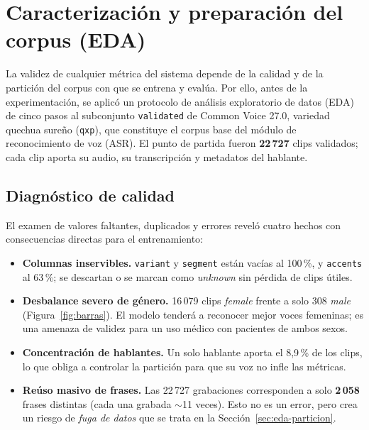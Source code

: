 %
%

\section{Caracterización y preparación del corpus (EDA)}
\label{sec:eda}

La validez de cualquier métrica del sistema depende de la calidad y de la partición
del corpus con que se entrena y evalúa. Por ello, antes de la experimentación, se aplicó
un protocolo de análisis exploratorio de datos (EDA) de cinco pasos al subconjunto
\texttt{validated} de Common Voice 27.0, variedad quechua sureño (\texttt{qxp}), que
constituye el corpus base del módulo de reconocimiento de voz (ASR). El punto de partida
fueron \textbf{22\,727} clips validados; cada clip aporta su audio, su transcripción y
metadatos del hablante.

\subsection{Diagnóstico de calidad}
\label{sec:eda-calidad}

El examen de valores faltantes, duplicados y errores reveló cuatro hechos con
consecuencias directas para el entrenamiento:

\begin{itemize}\itemsep2pt
  \item \textbf{Columnas inservibles.} \texttt{variant} y \texttt{segment} están vacías
        al 100\,\%, y \texttt{accents} al 63\,\%; se descartan o se marcan como
        \emph{unknown} sin pérdida de clips útiles.
  \item \textbf{Desbalance severo de género.} 16\,079 clips \emph{female} frente a solo
        308 \emph{male} (Figura~\ref{fig:barras}). El modelo tenderá a reconocer mejor
        voces femeninas; es una amenaza de validez para un uso médico con pacientes de
        ambos sexos.
  \item \textbf{Concentración de hablantes.} Un solo hablante aporta el 8,9\,\% de los
        clips, lo que obliga a controlar la partición para que su voz no infle las
        métricas.
  \item \textbf{Reúso masivo de frases.} Las 22\,727 grabaciones corresponden a solo
        \textbf{2\,058} frases distintas (cada una grabada $\sim$11 veces). Esto no es
        un error, pero crea un riesgo de \emph{fuga de datos} que se trata en la
        Sección~\ref{sec:eda-particion}.
\end{itemize}

